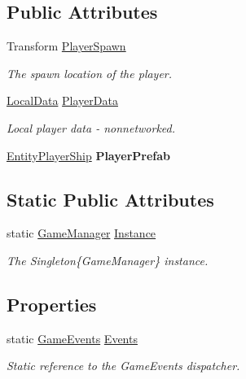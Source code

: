 \subsection*{Public Attributes}
\begin{DoxyCompactItemize}
\item 
Transform \hyperlink{class_skyrates_1_1_client_1_1_game_1_1_game_manager_ade8d1e4254dfb7141f1365a5751ef987}{Player\-Spawn}
\begin{DoxyCompactList}\small\item\em The spawn location of the player. \end{DoxyCompactList}\item 
\hyperlink{class_skyrates_1_1_client_1_1_data_1_1_local_data}{Local\-Data} \hyperlink{class_skyrates_1_1_client_1_1_game_1_1_game_manager_a370a843db6f1bc3d9a3e9a500aad0775}{Player\-Data}
\begin{DoxyCompactList}\small\item\em Local player data -\/ nonnetworked. \end{DoxyCompactList}\item 
\hypertarget{class_skyrates_1_1_client_1_1_game_1_1_game_manager_acda4510aab0db1c1fcbad7126d9ad221}{\hyperlink{class_skyrates_1_1_client_1_1_entity_1_1_entity_player_ship}{Entity\-Player\-Ship} {\bfseries Player\-Prefab}}\label{class_skyrates_1_1_client_1_1_game_1_1_game_manager_acda4510aab0db1c1fcbad7126d9ad221}

\end{DoxyCompactItemize}
\subsection*{Static Public Attributes}
\begin{DoxyCompactItemize}
\item 
static \hyperlink{class_skyrates_1_1_client_1_1_game_1_1_game_manager}{Game\-Manager} \hyperlink{class_skyrates_1_1_client_1_1_game_1_1_game_manager_accacf771756ee6a41d2c0ced6bf798ca}{Instance}
\begin{DoxyCompactList}\small\item\em The Singleton\{\-Game\-Manager\} instance. \end{DoxyCompactList}\end{DoxyCompactItemize}
\subsection*{Properties}
\begin{DoxyCompactItemize}
\item 
static \hyperlink{class_skyrates_1_1_client_1_1_game_1_1_event_1_1_game_events}{Game\-Events} \hyperlink{class_skyrates_1_1_client_1_1_game_1_1_game_manager_a0fe4743cbadedfc0ad93d51534f3d339}{Events}
\begin{DoxyCompactList}\small\item\em Static reference to the Game\-Events dispatcher. \end{DoxyCompactList}\end{DoxyCompactItemize}
